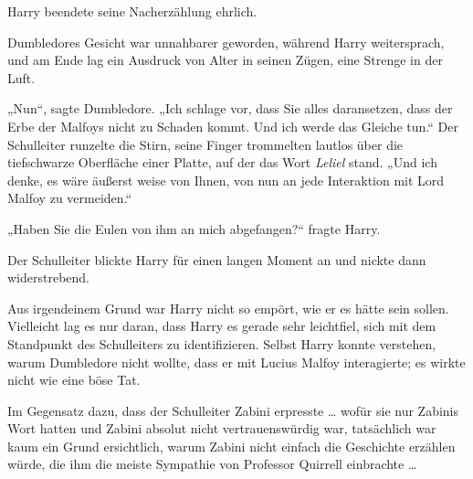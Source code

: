 Harry beendete seine Nacherzählung ehrlich.

Dumbledores Gesicht war unnahbarer geworden, während Harry weitersprach, und am Ende lag ein Ausdruck von Alter in seinen Zügen, eine Strenge in der Luft.

„Nun“, sagte Dumbledore.
„Ich schlage vor, dass Sie alles daransetzen, dass der Erbe der Malfoys nicht zu Schaden kommt. Und ich werde das Gleiche tun.“ Der Schulleiter runzelte die Stirn, seine Finger trommelten lautlos über die tiefschwarze Oberfläche einer Platte, auf der das Wort \emph{Leliel} stand.
„Und ich denke, es wäre äußerst weise von Ihnen, von nun an jede Interaktion mit Lord Malfoy zu vermeiden.“

„Haben Sie die Eulen von ihm an mich abgefangen?“ fragte Harry.

Der Schulleiter blickte Harry für einen langen Moment an und nickte dann widerstrebend.

Aus irgendeinem Grund war Harry nicht so empört, wie er es hätte sein sollen. Vielleicht lag es nur daran, dass Harry es gerade sehr leichtfiel, sich mit dem Standpunkt des Schulleiters zu identifizieren. Selbst Harry konnte verstehen, warum Dumbledore nicht wollte, dass er mit Lucius Malfoy interagierte; es wirkte nicht wie eine böse Tat.

Im Gegensatz dazu, dass der Schulleiter Zabini erpresste … wofür sie nur Zabinis Wort hatten und Zabini absolut nicht vertrauenswürdig war, tatsächlich war kaum ein Grund ersichtlich, warum Zabini nicht einfach die Geschichte erzählen würde, die ihm die meiste Sympathie von Professor Quirrell einbrachte …

